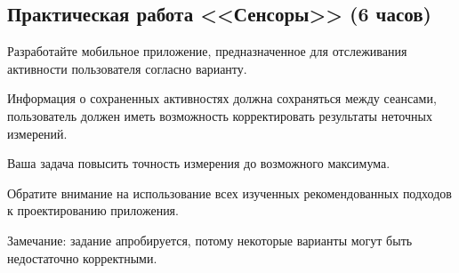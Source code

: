 \subsection{Практическая работа <<Сенсоры>> (6 часов)}

Разработайте мобильное приложение, предназначенное для отслеживания активности пользователя согласно варианту. 

Информация о сохраненных активностях должна сохраняться между сеансами, пользователь должен иметь возможность корректировать результаты неточных измерений.

Ваша задача повысить точность измерения до возможного максимума.

Обратите внимание на использование всех изученных рекомендованных подходов к проектированию приложения.

Замечание: задание апробируется, потому некоторые варианты могут быть недостаточно корректными.

